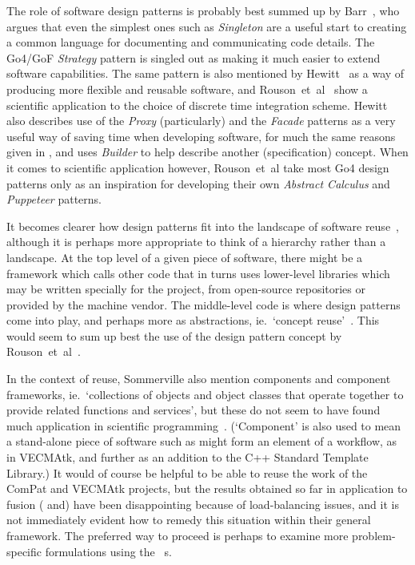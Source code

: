 The role of software design patterns is probably best summed up by Barr~\cite[\S\,7]{barr},
who argues that even the simplest ones such as {\it Singleton} are a useful start to creating a common language
for documenting and communicating code details. The Go4/GoF {\it Strategy} pattern is singled out as making it
much easier to extend software capabilities. The same pattern is also mentioned by
Hewitt~\cite[\S\,7]{hewitt} as a way
of producing more flexible and reusable software, and Rouson~et~al~\cite{rousonxiaxu} show a scientific
application to the choice of discrete time integration scheme. Hewitt~\cite[\S\,8]{hewitt} also
describes use of the {\it Proxy}
(particularly) and the {\it Facade} patterns as a very useful way of saving time
when developing software, for much the same reasons given in ,
and uses {\it Builder} to help describe another (specification) concept.
When it comes to scientific application
however, Rouson~et~al take most Go4 design patterns only as an inspiration for developing their own 
{\it Abstract Calculus} and {\it Puppeteer} patterns.

It becomes clearer how design patterns fit into the landscape of software reuse~\cite[\S\,15]{sommerville},
although it is perhaps more appropriate to think of a hierarchy rather than a landscape. At the top level of a given 
piece of software, there might
be a framework which calls other code that in turns uses lower-level libraries which may be written specially for the
project, from open-source repositories or provided by the machine vendor. The middle-level code is
where design patterns come into
play, and perhaps more as abstractions, ie.\ `concept reuse'~\cite[7.3.1]{sommerville}. This would seem
to sum up best the use of the design pattern concept by Rouson~et~al~\cite{rousonxiaxu}.

In the context of reuse, Sommerville also mention components and component frameworks,
ie.\ `collections of objects and object classes 
that operate together to provide related functions and services', but these do not seem to have found
much application in scientific programming~\cite[\S\,1.4]{rousonxiaxu}. (`Component' is also used to mean
a stand-alone piece of software such as might form an element of a workflow, as in VECMAtk, and further as an
addition to the C++ Standard Template Library.) It would of course be helpful to be able to reuse
the work of the ComPat and VECMAtk projects, but the results obtained so far in application to fusion ( and)
have been disappointing because of load-balancing issues, and it is not immediately evident how to remedy this situation
within their general framework. The preferred way to proceed is perhaps to examine more problem-specific
formulations using the \nep\ \papp s.

